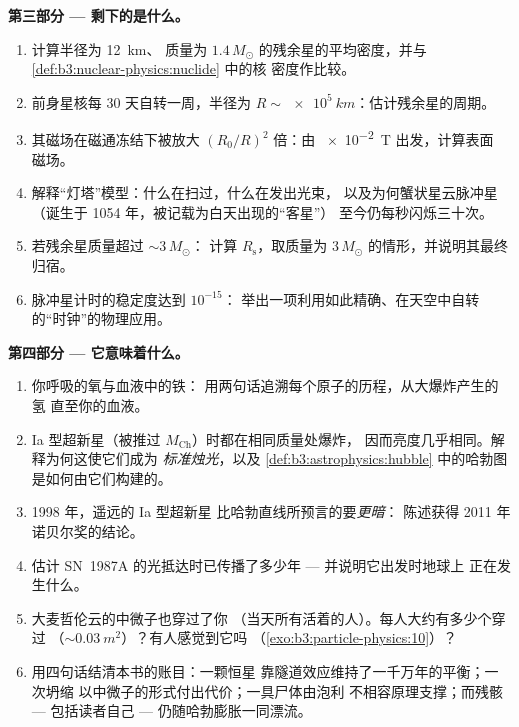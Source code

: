 \begin{problem}
\medskip\noindent\textbf{第三部分 --- 剩下的是什么。}

\begin{enumerate}[resume]
  \item 计算半径为 \qty{12}{km}、
        质量为 $1.4\,M_\odot$ 的残余星的平均密度，并与
        \cref{def:b3:nuclear-physics:nuclide} 中的核
        密度作比较。
  \item 前身星核每 30 天自转一周，半径为
        $R \sim \qty{e5}{km}$：估计残余星的周期。
  \item 其磁场在磁通冻结下被放大
        $(R_0/R)^2$ 倍：由 \qty{e-2}{T} 出发，计算表面
        磁场。
  \item 解释“灯塔”模型：什么在扫过，什么在发出光束，
        以及为何蟹状星云脉冲星（诞生于 1054 年，被记载为白天出现的“客星”）
        至今仍每秒闪烁三十次。
  \item 若残余星质量超过 ${\sim}3\,M_\odot$：
        计算 $R_{\text{s}}$，取质量为 $3\,M_\odot$ 的情形，并说明其最终归宿。
  \item 脉冲星计时的稳定度达到 $10^{-15}$：
        举出一项利用如此精确、在天空中自转的“时钟”的物理应用。
\end{enumerate}

\medskip\noindent\textbf{第四部分 --- 它意味着什么。}

\begin{enumerate}[resume]
  \item 你呼吸的氧与血液中的铁：
        用两句话追溯每个原子的历程，从大爆炸产生的氢
        直至你的血液。
  \item Ia 型超新星（被推过
        $M_{\text{Ch}}$）时都在相同质量处爆炸，
        因而亮度几乎相同。解释为何这使它们成为
        \emph{标准烛光}，以及
        \cref{def:b3:astrophysics:hubble} 中的哈勃图
        是如何由它们构建的。
  \item 1998 年，遥远的 Ia 型超新星
        比哈勃直线所预言的要\emph{更暗}：
        陈述获得 2011 年诺贝尔奖的结论。
  \item 估计 SN~1987A 的光抵达时已传播了多少年
        --- 并说明它出发时地球上
        正在发生什么。
  \item 大麦哲伦云的中微子也穿过了你
        （当天所有活着的人）。每人大约有多少个穿过
        （${\sim}\qty{0.03}{m^2}$）？有人感觉到它吗
        （\cref{exo:b3:particle-physics:10}）？
  \item 用四句话结清本书的账目：一颗恒星
        靠隧道效应维持了一千万年的平衡；一次坍缩
        以中微子的形式付出代价；一具尸体由泡利
        不相容原理支撑；而残骸 --- 包括读者自己 ---
        仍随哈勃膨胀一同漂流。
\end{enumerate}
\end{problem}
